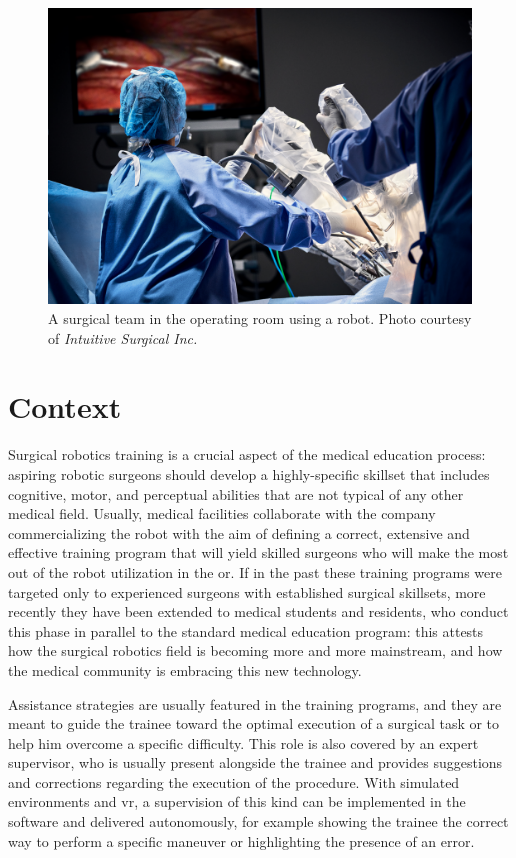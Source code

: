 \documentclass[../main.tex]{subfiles}
\begin{document}
\begin{figure}[h]
    \centering
    \includegraphics[width=\textwidth]{images/davinci_or.jpg}
    \caption{A surgical team in the operating room using a \davinci robot. Photo courtesy of \textit{Intuitive Surgical Inc.}}
    \label{fig:davincior}
\end{figure}

\section{Context}
Surgical robotics training is a crucial aspect of the medical education process: aspiring robotic surgeons should develop a highly-specific skillset that includes cognitive, motor, and perceptual abilities that are not typical of any other medical field. Usually, medical facilities collaborate with the company commercializing the robot with the aim of defining a correct, extensive and effective training program that will yield skilled surgeons who will make the most out of the robot utilization in the \ac{or}. If in the past these training programs were targeted only to experienced surgeons with established surgical skillsets, more recently they have been extended to medical students and residents, who conduct this phase in parallel to the standard medical education program: this attests how the surgical robotics field is becoming more and more mainstream, and how the medical community is embracing this new technology. 

Assistance strategies are usually featured in the training programs, and they are meant to guide the trainee toward the optimal execution of a surgical task or to help him overcome a specific difficulty. This role is also covered by an expert supervisor, who is usually present alongside the trainee and provides suggestions and corrections regarding the execution of the procedure. With simulated environments and \ac{vr}, a supervision of this kind can be implemented in the software and delivered autonomously, for example showing the trainee the correct way to perform a specific maneuver or highlighting the presence of an error. 
\end{document}
